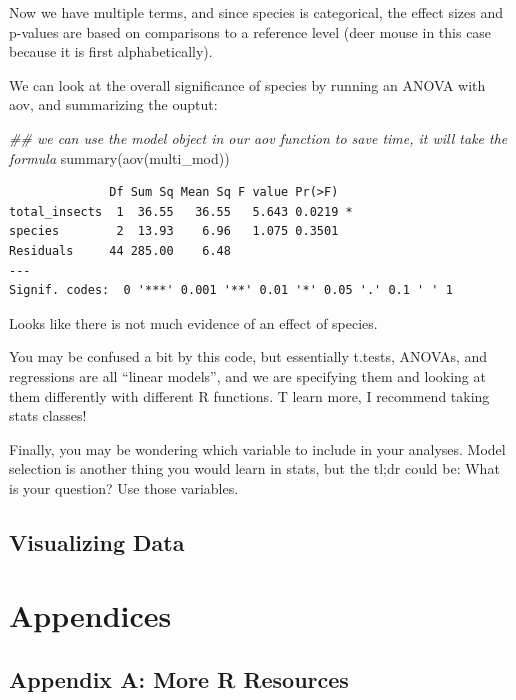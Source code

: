 \documentclass[
  letterpaper,
  DIV=11,
  numbers=noendperiod]{scrreprt}
\newenvironment{Shaded}{\begin{snugshade}}{\end{snugshade}}
\newcommand{\DocumentationTok}[1]{\textcolor[rgb]{0.37,0.37,0.37}{\textit{#1}}}
\newcommand{\FunctionTok}[1]{\textcolor[rgb]{0.28,0.35,0.67}{#1}}
\newcommand{\NormalTok}[1]{\textcolor[rgb]{0.00,0.23,0.31}{#1}}
\begin{document}
Now we have multiple terms, and since species is categorical, the effect
sizes and p-values are based on comparisons to a reference level (deer
mouse in this case because it is first alphabetically).

We can look at the overall significance of species by running an ANOVA
with aov, and summarizing the ouptut:

\begin{Shaded}
\begin{Highlighting}[]
\DocumentationTok{\#\# we can use the model object in our aov function to save time, it will take the formula}
\FunctionTok{summary}\NormalTok{(}\FunctionTok{aov}\NormalTok{(multi\_mod))}
\end{Highlighting}
\end{Shaded}

\begin{verbatim}
              Df Sum Sq Mean Sq F value Pr(>F)  
total_insects  1  36.55   36.55   5.643 0.0219 *
species        2  13.93    6.96   1.075 0.3501  
Residuals     44 285.00    6.48                 
---
Signif. codes:  0 '***' 0.001 '**' 0.01 '*' 0.05 '.' 0.1 ' ' 1
\end{verbatim}

Looks like there is not much evidence of an effect of species.

You may be confused a bit by this code, but essentially t.tests, ANOVAs,
and regressions are all ``linear models'', and we are specifying them
and looking at them differently with different R functions. T learn
more, I recommend taking stats classes!

Finally, you may be wondering which variable to include in your
analyses. Model selection is another thing you would learn in stats, but
the tl;dr could be: What is your question? Use those variables.

\hypertarget{visualizing-data}{%
\chapter{Visualizing Data}\label{visualizing-data}}

\part{Appendices}

\hypertarget{appendix-a-more-r-resources}{%
\chapter{Appendix A: More R
Resources}\label{appendix-a-more-r-resources}}
\end{document}
